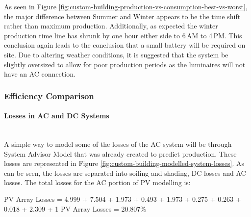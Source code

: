 As seen in Figure \ref{fig:custom-building-production-vs-consumption-best-vs-worst}, the major difference between Summer and Winter appears to be the time shift rather than maximum production. Additionally, as expected the winter production time line has shrunk by one hour either side to 6\,AM to 4\,PM. This conclusion again leads to the conclusion that a small battery will be required on site. Due to altering weather conditions, it is suggested that the system be slightly oversized to allow for poor production periods as the luminaires will not have an AC connection.  

\subsubsection{Efficiency Comparison}

\paragraph{Losses in AC and DC Systems}
~\\
A simple way to model some of the losses of the AC system will be through System Advisor Model that was already created to predict production. These losses are represented in Figure \ref{fig:custom-building-modelled-system-losses}. As can be seen, the losses are separated into soiling and shading, DC losses and AC losses. The total losses for the AC portion of PV modelling is:  

\begin{center}
	PV Array Losses = 4.999 + 7.504 + 1.973 + 0.493 + 1.973 + 0.275 + 0.263 + 0.018 + 2.309 + 1
	\newline
	PV Array Losses = 20.807\%
\end{center} 

